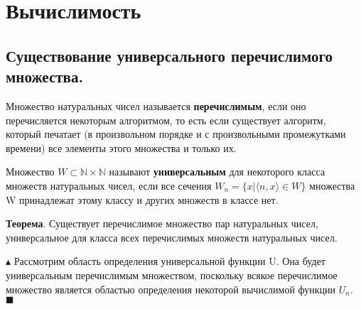 \section{Вычислимость}

\subsection{Существование универсального перечислимого множества.}

Множество натуральных чисел называется \textbf{перечислимым}, если оно перечисляется некоторым алгоритмом, то есть если существует алгоритм, который печатает (в произвольном порядке и с произвольными промежутками времени) все элементы этого множества и только их.

Множество $W \subset \mathbb{N} \times \mathbb{N}$ называют \textbf{универсальным} для некоторого класса множеств натуральных чисел, если все сечения $W_n = \{x | \langle n, x \rangle \in W\}$ множества W принадлежат этому классу и других множеств в классе нет.

\textbf{Теорема}. Существует перечислимое множество пар натуральных чисел, универсальное для класса всех перечислимых множеств натуральных чисел.

$\blacktriangle$
Рассмотрим область определения универсальной функции U. Она будет универсальным перечислимым множеством, поскольку всякое перечислимое множество является областью определения некоторой вычислимой функции $U_n$.
$\blacksquare$